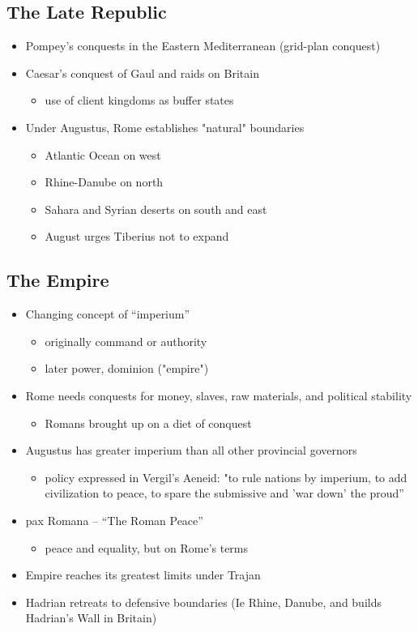 \documentclass[12pt, twoside]{article}
\begin{document}
\subsection{The Late Republic}
\begin{itemize}
\item Pompey's conquests in the Eastern Mediterranean (grid-plan conquest)
\item Caesar's conquest of Gaul and raids on Britain
	\begin{itemize}
	\item use of client kingdoms as buffer states
	\end{itemize}
\item Under Augustus, Rome establishes "natural" boundaries
	\begin{itemize}
	\item Atlantic Ocean on west
	\item Rhine-Danube on north
	\item Sahara and Syrian deserts on south and east
	\item August urges Tiberius not to expand 
	\end{itemize}
\end{itemize}

\subsection{The Empire}
\begin{itemize}
\item Changing concept of “imperium”
	\begin{itemize}
	\item originally command or authority
	\item later power, dominion ("empire")
	\end{itemize}
\item Rome needs conquests for money, slaves, raw materials, and political stability
	\begin{itemize}
	\item Romans brought up on a diet of conquest
	\end{itemize}
\item Augustus has greater imperium than all other provincial governors
	\begin{itemize}
	\item policy expressed in Vergil's Aeneid: "to rule nations by imperium, to add civilization to peace, to spare the submissive and 'war down' the proud”
	\end{itemize}
\item pax Romana – “The Roman Peace”
	\begin{itemize}
	\item peace and equality, but on Rome’s terms
	\end{itemize}
\item Empire reaches its greatest limits under Trajan
\item Hadrian retreats to defensive boundaries (Ie Rhine, Danube, and builds Hadrian’s Wall in Britain)
\end{itemize}
\end{document}
